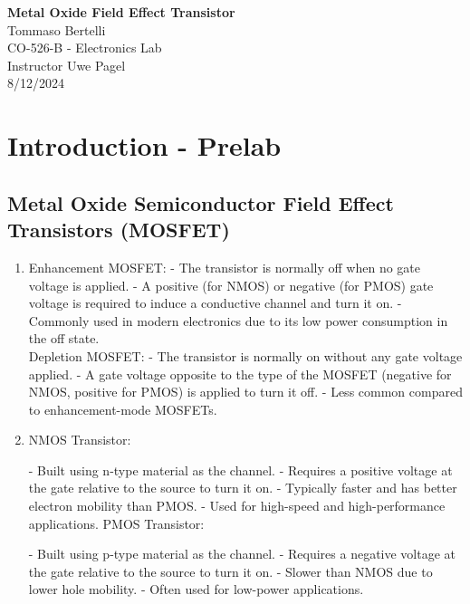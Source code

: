 \documentclass{article}
\begin{document}
	
	\mbox{}
	\vspace{10cm}
	\begin{center}
		\textbf{\Huge{Metal Oxide Field Effect Transistor}}\\
		\bigskip
		\Large{Tommaso Bertelli}\\
		\bigskip
		\Large{CO-526-B - Electronics Lab}\\
		\bigskip
		\Large{Instructor Uwe Pagel}\\
		\bigskip
		\Large{8/12/2024}\\
	\end{center}
	\pagebreak
	
	\section{Introduction - Prelab}
		\subsection{Metal Oxide Semiconductor Field Effect Transistors (MOSFET)}
			\begin{enumerate}
				\item 
				Enhancement MOSFET:
				- The transistor is normally off when no gate voltage is applied.
				- A positive (for NMOS) or negative (for PMOS) gate voltage is required to induce a conductive channel and turn it on.
				- Commonly used in modern electronics due to its low power consumption in the off state.\\
				Depletion MOSFET:		
				- The transistor is normally on without any gate voltage applied.
				- A gate voltage opposite to the type of the MOSFET (negative for NMOS, positive for PMOS) is applied to turn it off.
				- Less common compared to enhancement-mode MOSFETs.
				\item 
				NMOS Transistor:
				
				- Built using n-type material as the channel.
				- Requires a positive voltage at the gate relative to the source to turn it on.
				- Typically faster and has better electron mobility than PMOS.
				- Used for high-speed and high-performance applications.
				PMOS Transistor:
				
				- Built using p-type material as the channel.
				- Requires a negative voltage at the gate relative to the source to turn it on.
				- Slower than NMOS due to lower hole mobility.
				- Often used for low-power applications.
			\end{enumerate}
\end{document}
